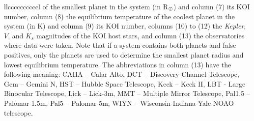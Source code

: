 \documentclass[twocolumn,appendixfloats]{aastex6}
\newcommand{\RE}{R$_{\Earth}$}
\begin{document}
\begin{deluxetable*}{llccccccccccl}
{of the smallest planet in the system (in \RE) and column (7) its KOI number, column (8)
the equilibrium temperature of the coolest planet in the system (in K) and column (9)
its KOI number, columns (10) to (12) the {\it Kepler}, $V$, and $K_s$ magnitudes
of the KOI host stars, and column (13) the observatories where data were taken.
Note that if a system contains both planets and false positives, only the planets are
used to determine the smallest planet radius and lowest equilibrium temperature.
The abbreviations in column (13) have the following meaning: CAHA -- Calar Alto,
DCT -- Discovery Channel Telescope, Gem -- Gemini N, HST -- Hubble Space
Telescope, Keck -- Keck II, LBT - Large Binocular Telescope, Lick -- Lick-3m,
MMT -- Multiple Mirror Telescope, Pal1.5 -- Palomar-1.5m, Pal5 -- Palomar-5m,
WIYN -- Wisconsin-Indiana-Yale-NOAO telescope.}
\end{deluxetable*}
\end{document}
